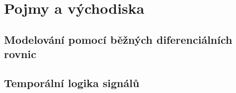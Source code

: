 \chapter{Pojmy a východiska}
\section{Modelování pomocí běžných diferenciálních rovnic}
\section{Temporální logika signálů}
